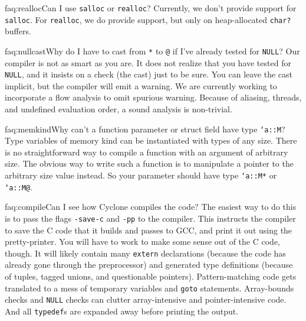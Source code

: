 \begin{faqa}{faq:realloc}{Can I use \texttt{salloc} or \texttt{realloc}?}
Currently, we don't provide support for \texttt{salloc}.  For 
\texttt{realloc}, we do provide support, but only on heap-allocated
\texttt{char?} buffers.
\end{faqa}

\begin{faqa}{faq:nullcast}{Why do I have to cast from \texttt{*} to \texttt{@} if I've already tested for \texttt{NULL}?} 
Our compiler is not as smart as you are.  It does not realize that you
have tested for \texttt{NULL}, and it insists on a check (the cast)
just to be sure.  You can leave the cast implicit, but the compiler
will emit a warning.  We are currently working to incorporate a flow
analysis to omit spurious warning.  Because of aliasing, threads, and 
undefined evaluation order, a sound analysis is non-trivial.
\end{faqa}

\begin{faqa}{faq:memkind}{Why can't a function parameter or struct field have type \texttt{`a::M}?} 
Type variables of memory kind can be instantiated with types of any
size.  There is no straightforward way to compile a function with an
argument of arbitrary size.  The obvious way to write such a function
is to manipulate a pointer to the arbitrary size value instead.  So
your parameter should have type \texttt{`a::M*} or \texttt{`a::M@}.
\end{faqa}

\begin{faqa}{faq:compile}{Can I see how Cyclone compiles the code?}
The easiest way to do this is to pass the flags \texttt{-save-c} and
\texttt{-pp} to the compiler.  This instructs the compiler to save the
C code that it builds and passes to GCC, and print it out using the
pretty-printer.  You will have to work to make some sense out of the C
code, though.  It will likely contain many \texttt{extern}
declarations (because the code has already gone through the
preprocessor) and generated type definitions (because of tuples,
tagged unions, and questionable pointers).  Pattern-matching code gets
translated to a mess of temporary variables and \texttt{goto}
statements.  Array-bounds checks and \texttt{NULL} checks can clutter
array-intensive and pointer-intensive code.  And all \texttt{typedef}s
are expanded away before printing the output.
\end{faqa}

